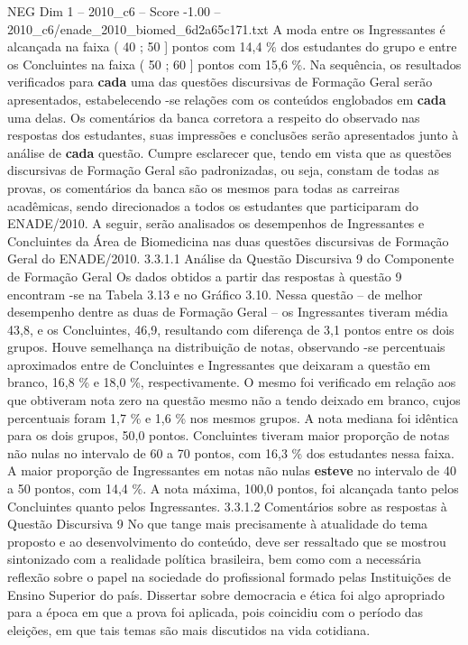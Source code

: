 \begin{textsample}{NEG Dim 1 – 2010\_c6 – Score -1.00 – 2010\_c6/enade\_2010\_biomed\_6d2a65c171.txt}
A moda entre os Ingressantes é alcançada na faixa ( 40 ; 50 ] pontos com 14,4 \% dos estudantes do grupo e entre os Concluintes na faixa ( 50 ; 60 ] pontos com 15,6 \%.
Na sequência, os resultados verificados para \textbf{cada} uma das questões discursivas de Formação Geral serão apresentados, estabelecendo -se relações com os conteúdos englobados em \textbf{cada} uma delas.
Os comentários da banca corretora a respeito do observado nas respostas dos estudantes, suas impressões e conclusões serão apresentados junto à análise de \textbf{cada} questão.
Cumpre esclarecer que, tendo em vista que as questões discursivas de Formação Geral são padronizadas, ou seja, constam de todas as provas, os comentários da banca são os mesmos para todas as carreiras acadêmicas, sendo direcionados a todos os estudantes que participaram do ENADE/2010.
A seguir, serão analisados os desempenhos de Ingressantes e Concluintes da Área de Biomedicina nas duas questões discursivas de Formação Geral do ENADE/2010. 3.3.1.1 Análise da Questão Discursiva 9 do Componente de Formação Geral Os dados obtidos a partir das respostas à questão 9 encontram -se na Tabela 3.13 e no Gráfico 3.10.
Nessa questão – de melhor desempenho dentre as duas de Formação Geral – os Ingressantes tiveram média 43,8, e os Concluintes, 46,9, resultando com diferença de 3,1 pontos entre os dois grupos.
Houve semelhança na distribuição de notas, observando -se percentuais aproximados entre de Concluintes e Ingressantes que deixaram a questão em branco, 16,8 \% e 18,0 \%, respectivamente.
O mesmo foi verificado em relação aos que obtiveram nota zero na questão mesmo não a tendo deixado em branco, cujos percentuais foram 1,7 \% e 1,6 \% nos mesmos grupos.
A nota mediana foi idêntica para os dois grupos, 50,0 pontos.
Concluintes tiveram maior proporção de notas não nulas no intervalo de 60 a 70 pontos, com 16,3 \% dos estudantes nessa faixa.
A maior proporção de Ingressantes em notas não nulas \textbf{esteve} no intervalo de 40 a 50 pontos, com 14,4 \%.
A nota máxima, 100,0 pontos, foi alcançada tanto pelos Concluintes quanto pelos Ingressantes. 3.3.1.2 Comentários sobre as respostas à Questão Discursiva 9 No que tange mais precisamente à atualidade do tema proposto e ao desenvolvimento do conteúdo, deve ser ressaltado que se mostrou sintonizado com a realidade política brasileira, bem como com a necessária reflexão sobre o papel na sociedade do profissional formado pelas Instituições de Ensino Superior do país.
Dissertar sobre democracia e ética foi algo apropriado para a época em que a prova foi aplicada, pois coincidiu com o período das eleições, em que tais temas são mais discutidos na vida cotidiana.

\end{textsample}
